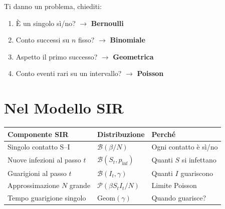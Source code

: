 \documentclass[a4paper,11pt]{article}
\begin{document}
\vspace{1em}
\begin{tcolorbox}[mybox=blue, title=Regola per l'esame]
Ti danno un problema, chiediti:
\begin{enumerate}[nosep]
    \item È un singolo sì/no? $\to$ \textbf{Bernoulli}
    \item Conto successi su $n$ fisso? $\to$ \textbf{Binomiale}
    \item Aspetto il primo successo? $\to$ \textbf{Geometrica}
    \item Conto eventi rari su un intervallo? $\to$ \textbf{Poisson}
\end{enumerate}
\end{tcolorbox}

\section{Nel Modello SIR}

\begin{center}
\begin{tabular}{lll}
\toprule
\textbf{Componente SIR} & \textbf{Distribuzione} & \textbf{Perché} \\
\midrule
Singolo contatto S--I & $\mathcal{B}(\beta/N)$ & Ogni contatto è sì/no \\
Nuove infezioni al passo $t$ & $\mathcal{B}(S_t, p_{\text{inf}})$ & Quanti $S$ si infettano \\
Guarigioni al passo $t$ & $\mathcal{B}(I_t, \gamma)$ & Quanti $I$ guariscono \\
Approssimazione $N$ grande & $\mathcal{P}(\beta S_t I_t / N)$ & Limite Poisson \\
Tempo guarigione singolo & $\text{Geom}(\gamma)$ & Quando guarisce? \\
\bottomrule
\end{tabular}
\end{center}
\end{document}
